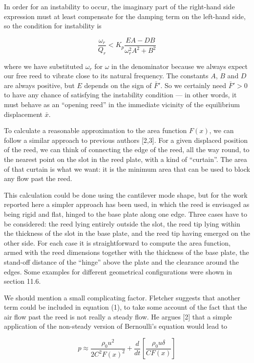   In order for an instability to occur, the imaginary part of the right-hand 
  side expression must at least compensate for the damping term on the 
  left-hand side, so the condition for instability is 

  $$\dfrac{\omega_r}{Q_r} < K_p\dfrac{EA-DB}{\omega_r^2 A^2 + B^2} \tag{17}$$ 

  where we have substituted $\omega_r$ for $\omega$ in the denominator because 
  we always expect our free reed to vibrate close to its natural frequency. The 
  constants $A$, $B$ and $D$ are always positive, but $E$ depends on the sign 
  of $\bar{F}'$. So we certainly need $\bar{F}'>0$ to have any chance of 
  satisfying the instability condition --- in other words, it must behave as an 
  ``opening reed'' in the immediate vicinity of the equilibrium displacement 
  $\bar{x}$. 

  To calculate a reasonable approximation to the area function $F(x)$, we can 
  follow a similar approach to previous authors [2,3]. For a given displaced 
  position of the reed, we can think of connecting the edge of the reed, all 
  the way round, to the nearest point on the slot in the reed plate, with a 
  kind of ``curtain''. The area of that curtain is what we want: it is the 
  minimum area that can be used to block any flow past the reed. 

  This calculation could be done using the cantilever mode shape, but for the 
  work reported here a simpler approach has been used, in which the reed is 
  envisaged as being rigid and flat, hinged to the base plate along one edge. 
  Three cases have to be considered: the reed lying entirely outside the slot, 
  the reed tip lying within the thickness of the slot in the base plate, and 
  the reed tip having emerged on the other side. For each case it is 
  straightforward to compute the area function, armed with the reed dimensions 
  together with the thickness of the base plate, the stand-off distance of the 
  ``hinge'' above the plate and the clearance around the edges. Some examples 
  for different geometrical configurations were shown in section 11.6. 

  We should mention a small complicating factor. Fletcher suggests that another 
  term could be included in equation (1), to take some account of the fact that 
  the air flow past the reed is not really a steady flow. He argues [2] that a 
  simple application of the non-steady version of Bernoulli's equation would 
  lead to 

  $$p \approx \dfrac{\rho_0 u^2}{2 C^2 F(x)^2} + \dfrac{d}{dt} \left[ 
  \dfrac{\rho_0 u \delta}{C F(x)} \right] \tag{18}$$ 

